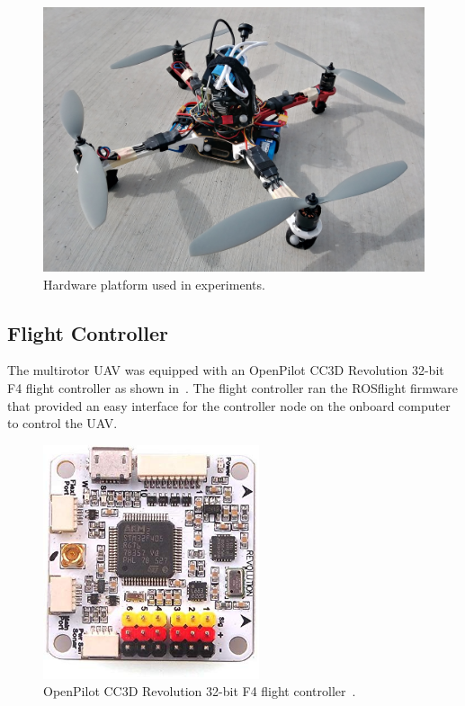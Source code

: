 \begin{figure}[htbp]
  \centering
  \includegraphics[scale=0.15]{figures/hardware_platform.jpg}
  \caption[Multirotor UAV Used in Experiments]{Hardware platform used in experiments.}
  \label{f:drone_pic}
\end{figure}

\subsection{Flight Controller}
The multirotor UAV was equipped with an OpenPilot CC3D Revolution 32-bit F4
flight controller as shown in~. The flight controller ran the
ROSflight firmware that provided an easy interface
for the controller node on the onboard computer to control the UAV.

\begin{figure}[htbp]
  \centering
  \includegraphics[width=2.5in]{figures/f4.jpg}
  \caption[OpenPilot CC3D Revolution 32-bit F4]{OpenPilot CC3D Revolution 32-bit
    F4 flight controller~\cite{openpilotrevo}.
}
%
  \label{fig:f4}
\end{figure}

